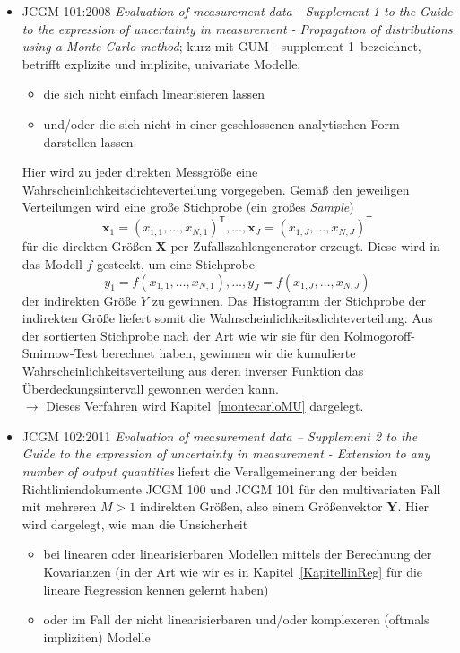 \begin{itemize}
\item JCGM 101:2008 \textsl{Evaluation of measurement
data - Supplement 1 to the Guide to the expression of
uncertainty in measurement - Propagation of distributions using a Monte Carlo method}; 
kurz mit \glqq GUM - supplement 1\grqq ~bezeichnet, betrifft
explizite und implizite, univariate Modelle,
  \begin{itemize}
  \item die sich nicht einfach linearisieren lassen 
  \item und/oder die sich nicht in einer geschlossenen analytischen Form darstellen lassen.
  \end{itemize}
Hier wird zu jeder direkten Messgröße eine Wahrscheinlichkeitsdichteverteilung vorgegeben.
Gemäß den jeweiligen Verteilungen wird eine große Stichprobe (ein großes \textsl{Sample}) 
$$
\mathbf{x}_1 = (x_{1,1},\dots,x_{N,1})^\mathsf{T}, \dots, \mathbf{x}_J = (x_{1,J},\dots,x_{N,J})^\mathsf{T}
$$
für die direkten Größen $\mathbf{X}$ per Zufallszahlengenerator erzeugt. Diese wird in das Modell $f$ gesteckt,
um eine Stichprobe
\begin{equation}
y_1 = f(x_{1,1},\dots,x_{N,1}), \dots, y_J = f(x_{1,J},\dots,x_{N,J})
\end{equation}
der indirekten Größe $Y$ zu gewinnen. Das Histogramm der Stichprobe der indirekten Größe liefert somit die
Wahrscheinlichkeitsdichteverteilung. Aus der sortierten Stichprobe nach der Art wie wir sie
für den Kolmogoroff-Smirnow-Test berechnet haben, gewinnen wir die kumulierte Wahrscheinlichkeitsverteilung
aus deren inverser Funktion das Überdeckungsintervall gewonnen werden kann.\\
$\rightarrow$ Dieses Verfahren wird Kapitel~\ref{montecarloMU} dargelegt.
\item JCGM 102:2011 \textsl{Evaluation of measurement data – Supplement 2 to the
Guide to the expression of uncertainty in measurement - Extension to any number of output quantities}
liefert die Verallgemeinerung der beiden Richtliniendokumente JCGM 100 und JCGM 101 für den multivariaten
Fall mit mehreren $M>1$ indirekten Größen, also einem Größenvektor $\mathbf{Y}$.
Hier wird dargelegt, wie man die Unsicherheit 
  \begin{itemize}
  \item bei linearen oder linearisierbaren Modellen
    mittels der Berechnung der Kovarianzen (in der Art wie wir es
    in Kapitel~\ref{KapitellinReg} für die lineare Regression kennen gelernt haben)
  \item oder im Fall der nicht linearisierbaren und/oder komplexeren (oftmals impliziten) Modelle

\end{itemize}
\end{itemize}
